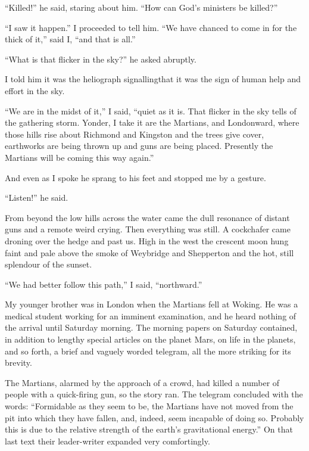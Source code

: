 ``Killed!'' he said, staring about him. ``How can God's ministers be
killed?''

``I saw it happen.'' I proceeded to tell him. ``We have chanced to
come in for the thick of it,'' said I, ``and that is all.''

``What is that flicker in the sky?'' he asked abruptly.

I told him it was the heliograph signalling\dash{}that it was the sign
of human help and effort in the sky.

``We are in the midst of it,'' I said, ``quiet as it is. That flicker
in the sky tells of the gathering storm. Yonder, I take it are the
Martians, and Londonward, where those hills rise about Richmond and
Kingston and the trees give cover, earthworks are being thrown up
and guns are being placed. Presently the Martians will be coming
this way again.''

And even as I spoke he sprang to his feet and stopped me by a
gesture.

``Listen!'' he said.

From beyond the low hills across the water came the dull resonance
of distant guns and a remote weird crying. Then everything was
still. A cockchafer came droning over the hedge and past us. High
in the west the crescent moon hung faint and pale above the smoke
of Weybridge and Shepperton and the hot, still splendour of the
sunset.

``We had better follow this path,'' I said, ``northward.''

My younger brother was in London when the Martians fell at Woking.
He was a medical student working for an imminent examination, and
he heard nothing of the arrival until Saturday morning. The morning
papers on Saturday contained, in addition to lengthy special
articles on the planet Mars, on life in the planets, and so forth,
a brief and vaguely worded telegram, all the more striking for its
brevity.

The Martians, alarmed by the approach of a crowd, had killed a
number of people with a quick-firing gun, so the story ran. The
telegram concluded with the words: ``Formidable as they seem to be,
the Martians have not moved from the pit into which they have
fallen, and, indeed, seem incapable of doing so. Probably this is
due to the relative strength of the earth's gravitational energy.''
On that last text their leader-writer expanded very comfortingly.

